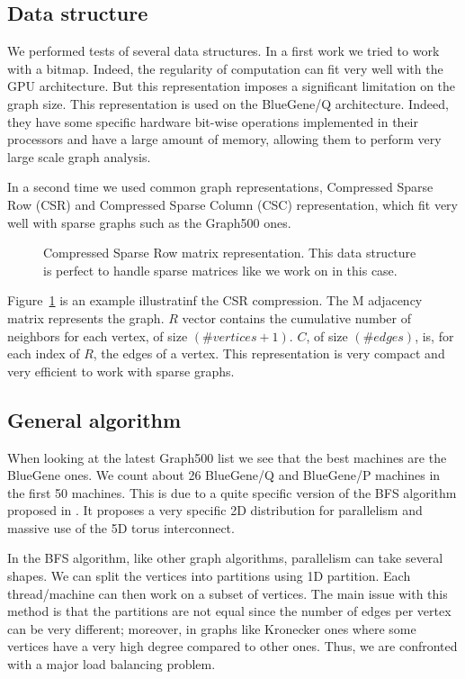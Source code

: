 \subsection{Data structure}
We performed tests of several data structures.
In a first work we tried to work with a bitmap. Indeed, the regularity of computation can fit very well with the GPU architecture. But this representation imposes a significant limitation on the graph size. 
This representation is used on the BlueGene/Q architecture. 
Indeed, they have some specific hardware bit-wise operations implemented in their processors and have a large amount of memory, allowing them to perform very large scale graph analysis. 

In a second time we used common graph representations, Compressed Sparse Row (CSR) and Compressed Sparse Column (CSC) representation, which fit very well with sparse graphs such as the Graph500 ones.

\begin{figure}[t!]
\begin{center}

\end{center}
\caption[Compressed Sparse Row data representation]{Compressed Sparse Row matrix representation. This data structure is perfect to handle sparse matrices like we work on in this case.}
\label{fig:csr_representation}
\end{figure}

Figure~\ref{fig:csr_representation} is an example illustratinf the CSR compression.
The M adjacency matrix represents the graph. $R$ vector contains the cumulative number of neighbors for each vertex, of size $(\#vertices +1)$. $C$, of size $(\#edges)$, is, for each index of $R$, the edges of a vertex.
This representation is very compact and very efficient to work with sparse graphs. 

\subsection{General algorithm}

When looking at the latest Graph500 list we see that the best machines are the BlueGene ones. 
We count about 26 BlueGene/Q and BlueGene/P machines in the first 50 machines.
This is due to a quite specific version of the BFS algorithm proposed in \cite{6468459}. 
It proposes a very specific 2D distribution for parallelism and massive use of the 5D torus interconnect. 

In the BFS algorithm, like other graph algorithms, parallelism can take several shapes. 
We can split the vertices into partitions using 1D partition. 
Each thread/machine can then work on a subset of vertices. 
The main issue with this method is that the partitions are not equal since the number of edges per vertex can be very different; 
moreover, in graphs like Kronecker ones where some vertices have a very high degree compared to other ones.
Thus, we are confronted with a major load balancing problem. 

